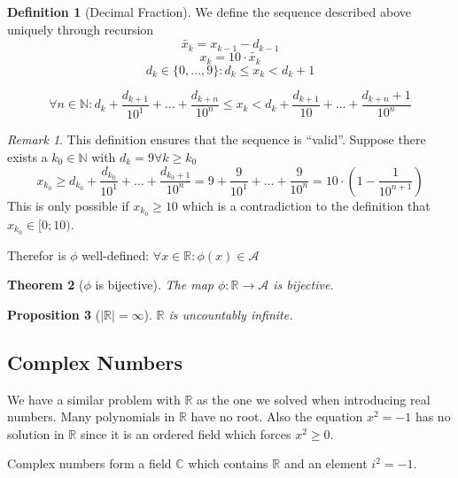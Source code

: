\documentclass[english,titlepage]{uzhpub}
\theoremstyle{definition}
\newtheorem{definition}{Definition}[section]
\theoremstyle{plain}
\newtheorem{proposition}[definition]{Proposition}
\newtheorem{theorem}[definition]{Theorem} %
\theoremstyle{remark}
\newtheorem*{remark}{Remark}
\theoremstyle{example}
\begin{document}
   \begin{definition}[Decimal Fraction]
      We define the sequence described above uniquely through recursion
      \[\widetilde{x_k} = x_{k-1} - d_{k-1}\]
      \[x_k = 10 \cdot \widetilde{x_k}\]
      \[d_k \in \{0,\ldots,9\}: d_k \leq x_k < d_k + 1\]

      \[\forall n \in \mathbb{N}: d_k + \frac{d_{k+1}}{10^1} + \ldots + \frac{d_{k+n}}{10^n} \leq x_k < d_k + \frac{d_{k+1}}{10} + \ldots + \frac{d_{k+n} + 1}{10^n}\]
   \end{definition}
   \begin{remark}
      This definition ensures that the sequence is ``valid''.
      Suppose there exists a \(k_0 \in \mathbb{N}\) with \(d_k = 9 \forall k \geq k_0\)
      \[x_{k_0} \geq d_{k_{0}} + \frac{d_{k_0}}{10^1} + \ldots + \frac{d_{k_0 + 1}}{10^n} = 9 + \frac{9}{10^1} + \ldots + \frac{9}{10^n} = 10 \cdot \left(1 - \frac{1}{10^{n+1}}\right)\]
      This is only possible if \(x_{k_{0}} \geq 10\) which is a contradiction to the definition that \(x_{k_0} \in [0;10)\).

      Therefor is \(\phi\) well-defined: \(\forall x \in \mathbb{R}: \phi(x) \in \mathcal{A}\)
   \end{remark}

   \begin{theorem}[\(\phi\) is bijective]\label{thm:decimal_map}
      The map \(\phi: \mathbb{R} \to \mathcal{A}\) is bijective.
   \end{theorem}

   \begin{proposition}[\(|\mathbb{R}| = \infty\)]\label{pro:R_uncountable}
      \(\mathbb{R}\) is uncountably infinite.
   \end{proposition}

   \subsection{Complex Numbers}
   We have a similar problem with \(\mathbb{R}\) as the one we solved when introducing real numbers.
   Many polynomials in \(\mathbb{R}\) have no root.
   Also the equation \(x^2 = -1\) has no solution in \(\mathbb{R}\) since it is an ordered field which forces \(x^2 \geq 0\).

   Complex numbers form a field \(\mathbb{C}\) which contains \(\mathbb{R}\) and an element \(i^2 = -1\).
\end{document}
